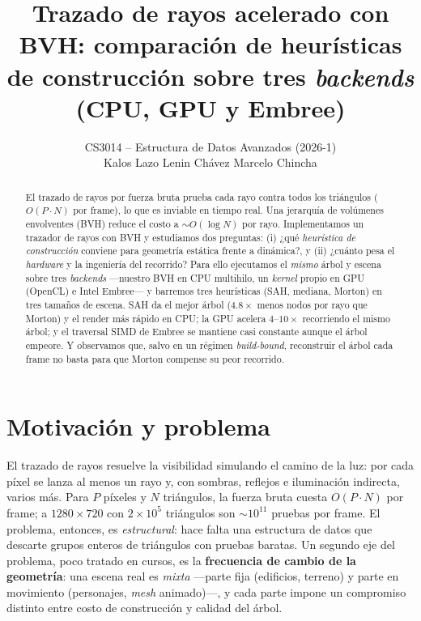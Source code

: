 \documentclass[10pt]{article}
\title{\vspace{-1.2em}Trazado de rayos acelerado con BVH: comparación de
       heurísticas de construcción sobre tres \emph{backends} (CPU, GPU y Embree)}
\author{CS3014 -- Estructura de Datos Avanzados (2026-1)\\[2pt]
        \small Kalos Lazo \quad Lenin Chávez \quad Marcelo Chincha}
\date{}
\begin{document}
\maketitle
\vspace{-1.4em}

\begin{abstract}\small
El trazado de rayos por fuerza bruta prueba cada rayo contra todos los
triángulos ($O(P\cdot N)$ por frame), lo que es inviable en tiempo real. Una
jerarquía de volúmenes envolventes (BVH) reduce el costo a $\sim\!O(\log N)$ por
rayo. Implementamos un trazador de rayos con BVH y estudiamos dos preguntas: (i)
¿qué \emph{heurística de construcción} conviene para geometría estática frente a
dinámica?, y (ii) ¿cuánto pesa el \emph{hardware} y la ingeniería del recorrido?
Para ello ejecutamos el \emph{mismo} árbol y escena sobre tres \emph{backends}
---nuestro BVH en CPU multihilo, un \emph{kernel} propio en GPU (OpenCL) e Intel
Embree--- y barremos tres heurísticas (SAH, mediana, Morton) en tres tamaños de
escena. SAH da el mejor árbol ($4.8\times$ menos nodos por rayo que Morton) y el
render más rápido en CPU; la GPU acelera $4$--$10\times$ recorriendo el mismo
árbol; y el traversal SIMD de Embree se mantiene casi constante aunque el árbol
empeore. Y observamos que, salvo en un régimen \emph{build-bound}, reconstruir el
árbol cada frame no basta para que Morton compense su peor recorrido.
\end{abstract}

\section{Motivación y problema}
El trazado de rayos resuelve la visibilidad simulando el camino de la luz: por
cada píxel se lanza al menos un rayo y, con sombras, reflejos e iluminación
indirecta, varios más. Para $P$ píxeles y $N$ triángulos, la fuerza bruta cuesta
$O(P\cdot N)$ por frame; a $1280\times720$ con $2\times10^5$ triángulos son
$\sim\!10^{11}$ pruebas por frame. El problema, entonces, es \emph{estructural}:
hace falta una estructura de datos que descarte grupos enteros de triángulos con
pruebas baratas. Un segundo eje del problema, poco tratado en cursos, es la
\textbf{frecuencia de cambio de la geometría}: una escena real es \emph{mixta}
---parte fija (edificios, terreno) y parte en movimiento (personajes, \emph{mesh}
animado)---, y cada parte impone un compromiso distinto entre costo de
construcción y calidad del árbol.
\end{document}
